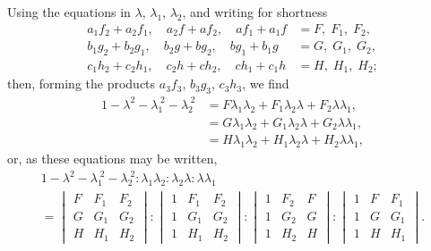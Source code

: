 \documentclass[11pt,a4paper]{article}
\theoremstyle{plain}
\theoremstyle{definition}
\theoremstyle{remark}
\begin{document}
Using the equations in $\lambda$, $\lambda_1$, $\lambda_2$, and writing for shortness
\begin{align*}
a_1f_2 + a_2f_1,\quad a_2f + af_2,\quad af_1 + a_1f &= F,\;F_1,\;F_2,\\
b_1g_2 + b_2g_1,\quad b_2g + bg_2,\quad bg_1 + b_1g &= G,\;G_1,\;G_2,\\
c_1h_2 + c_2h_1,\quad c_2h + ch_2,\quad ch_1 + c_1h &= H,\;H_1,\;H_2;
\end{align*}
then, forming the products $a_3f_3$, $b_3g_3$, $c_3h_3$, we find
\begin{align*}
1 - \lambda^2 - \lambda_1^{\;2} - \lambda_2^{\;2} &= F\lambda_1\lambda_2 + F_1\lambda_2\lambda + F_2\lambda\lambda_1,\\
&= G\lambda_1\lambda_2 + G_1\lambda_2\lambda + G_2\lambda\lambda_1,\\
&= H\lambda_1\lambda_2 + H_1\lambda_2\lambda + H_2\lambda\lambda_1,
\end{align*}
or, as these equations may be written,
\begin{multline*}
1 - \lambda^2 - \lambda_1^{\;2} - \lambda_2^{\;2} : \lambda_1\lambda_2 : \lambda_2\lambda : \lambda\lambda_1\\
= \begin{vmatrix} F & F_1 & F_2 \\ G & G_1 & G_2 \\ H & H_1 & H_2 \end{vmatrix}
: \begin{vmatrix} 1 & F_1 & F_2 \\ 1 & G_1 & G_2 \\ 1 & H_1 & H_2 \end{vmatrix}
: \begin{vmatrix} 1 & F_2 & F \\ 1 & G_2 & G \\ 1 & H_2 & H \end{vmatrix}
: \begin{vmatrix} 1 & F & F_1 \\ 1 & G & G_1 \\ 1 & H & H_1 \end{vmatrix}.
\end{multline*}
\end{document}
